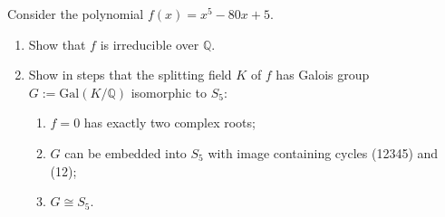 \begin{exercise}
\label{algebra:2015:11}
Consider the polynomial $f(x) = x^5 - 80x + 5$.
\begin{enumerate}
    \item Show that $f$ is irreducible over $\mathbb{Q}$.
    \item Show in steps that the splitting field $K$ of $f$ has Galois group $G := \mathrm{Gal}(K / \mathbb{Q})$ isomorphic to $S_5$:
    \begin{enumerate}
        \item $f = 0$ has exactly two complex roots;
        \item $G$ can be embedded into $S_5$ with image containing cycles (12345) and (12);
        \item $G \cong S_5$.
    \end{enumerate}
\end{enumerate}
\end{exercise}

